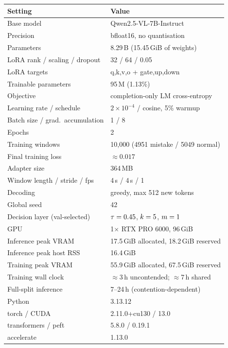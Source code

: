 \documentclass[10pt,twocolumn]{article}
\begin{document}
\begin{center}
\footnotesize
\begin{tabular}{@{}l@{\hspace{5pt}}p{}@{}}
\toprule
Setting & Value \\
\midrule
Base model & Qwen2.5-VL-7B-Instruct \\
Precision & bfloat16, no quantisation \\
Parameters & 8.29\,B (15.45\,GiB of weights) \\
LoRA rank / scaling / dropout & 32 / 64 / 0.05 \\
LoRA targets & q,k,v,o + gate,up,down \\
Trainable parameters & 95\,M (1.13\%) \\
Objective & completion-only LM cross-entropy \\
Learning rate / schedule & $2\times10^{-4}$ / cosine, 5\% warmup \\
Batch size / grad.\ accumulation & 1 / 8 \\
Epochs & 2 \\
Training windows & 10{,}000 (4951 mistake / 5049 normal) \\
Final training loss & $\approx 0.017$ \\
Adapter size & 364\,MB \\
\midrule
Window length / stride / fps & 4\,s / 4\,s / 1 \\
Decoding & greedy, max 512 new tokens \\
Global seed & 42 \\
Decision layer (val-selected) & $\tau=0.45$, $k=5$, $m=1$ \\
\midrule
GPU & 1$\times$ RTX PRO 6000, 96\,GiB \\
Inference peak VRAM & 17.5\,GiB allocated, 18.2\,GiB reserved \\
Inference peak host RSS & 16.4\,GiB \\
Training peak VRAM & 55.9\,GiB allocated, 67.5\,GiB reserved \\
Training wall clock & $\approx$3\,h uncontended; $\approx$7\,h shared \\
Full-split inference & 7--24\,h (contention-dependent) \\
\midrule
Python & 3.13.12 \\
torch / CUDA & 2.11.0+cu130 / 13.0 \\
transformers / peft & 5.8.0 / 0.19.1 \\
accelerate & 1.13.0 \\
\bottomrule
\end{tabular}
\end{center}
\end{document}
